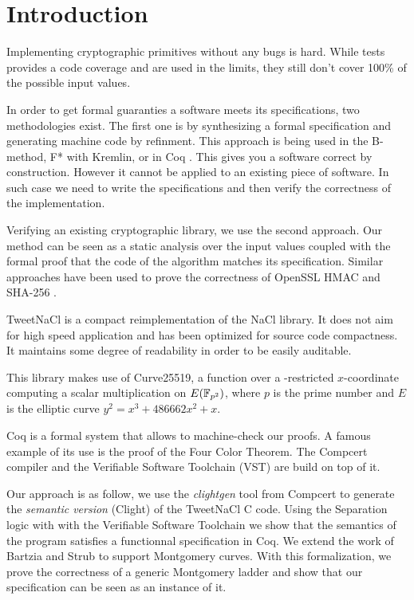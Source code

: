 \section{Introduction}

Implementing cryptographic primitives without any bugs is hard.
While tests provides a code coverage and are used in the limits,
they still don't cover 100\% of the possible input values.

In order to get formal guaranties a software meets its specifications,
two methodologies exist. The first one is by synthesizing a formal specification and
generating machine code by refinment. This approach is being used in the
B-method\cite{Abrial:1996:BAP:236705}, F* \cite{DBLP:journals/corr/BhargavanDFHPRR17} with Kremlin, or in Coq \cite{CpdtJFR}.
This gives you a software correct by construction. However it cannot be applied
to an existing piece of software. In such case we need to write the specifications
and then verify the correctness of the implementation.

Verifying an existing cryptographic library, we use the second approach.
Our method can be seen as a static analysis over the input values coupled
with the formal proof that the code of the algorithm matches its specification.
Similar approaches have been used to prove the correctness of OpenSSL HMAC
\cite{Beringer2015VerifiedCA} and SHA-256 \cite{Appel2015VerificationOA}.

TweetNaCl\cite{BGJ+15} is a compact reimplementation of the
NaCl\cite{BLS12} library. It does not aim for high speed
application and has been optimized for source code compactness.
It maintains some degree of readability in order to be easily auditable.

This library makes use of Curve25519\cite{Ber06}, a function over a -restricted
$x$-coordinate computing a scalar multiplication on $E(\mathbb{F}_{p^2})$, where $p$ is
the prime number \p and $E$ is the elliptic curve $y^2 = x^3 + 486662 x^2 + x$.

Coq is a formal system that allows to machine-check our proofs.
A famous example of its use is the proof of the Four Color Theorem.
The Compcert\cite{Leroy-backend} compiler and the Verifiable Software Toolchain
(VST)\cite{2012-Appel} are build on top of it.

Our approach is as follow, we use the \textit{clightgen} tool from Compcert to
generate the \textit{semantic version} (Clight\cite{Blazy-Leroy-Clight-09}) of
the TweetNaCl C code.
Using the Separation logic\cite{1969-Hoare,Reynolds02separationlogic}
with with the Verifiable Software Toolchain we show that the semantics of the
program satisfies a functionnal specification in Coq.
We extend the work of Bartzia and Strub \cite{DBLP:conf/itp/BartziaS14} to
support Montgomery curves.
With this formalization, we prove the correctness of a generic Montgomery ladder
and show that our specification can be seen as an instance of it.
